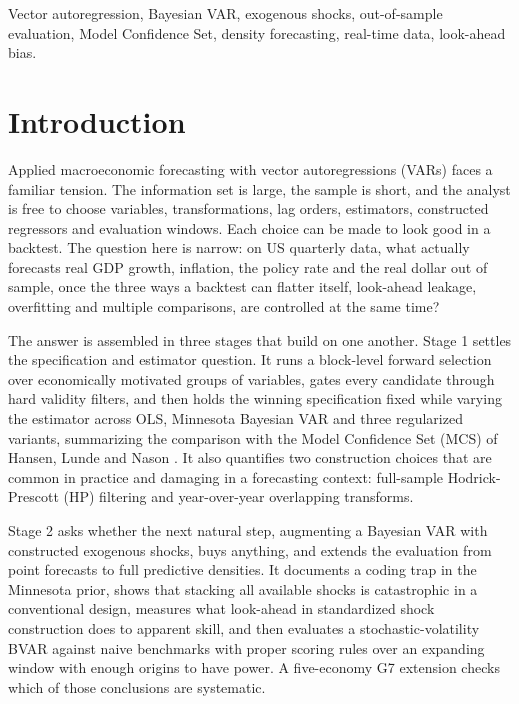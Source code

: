 \documentclass[conference]{IEEEtran}
\begin{document}
\begin{IEEEkeywords}
Vector autoregression, Bayesian VAR, exogenous shocks, out-of-sample evaluation, Model Confidence Set, density forecasting, real-time data, look-ahead bias.
\end{IEEEkeywords}

\section{Introduction}
Applied macroeconomic forecasting with vector autoregressions (VARs) faces a familiar tension. The information set is large, the sample is short, and the analyst is free to choose variables, transformations, lag orders, estimators, constructed regressors and evaluation windows. Each choice can be made to look good in a backtest. The question here is narrow: on US quarterly data, what actually forecasts real GDP growth, inflation, the policy rate and the real dollar out of sample, once the three ways a backtest can flatter itself, look-ahead leakage, overfitting and multiple comparisons, are controlled at the same time?

The answer is assembled in three stages that build on one another. Stage 1 settles the specification and estimator question. It runs a block-level forward selection over economically motivated groups of variables, gates every candidate through hard validity filters, and then holds the winning specification fixed while varying the estimator across OLS, Minnesota Bayesian VAR \cite{litterman1986,bgr2010} and three regularized variants, summarizing the comparison with the Model Confidence Set (MCS) of Hansen, Lunde and Nason \cite{hln2011}. It also quantifies two construction choices that are common in practice and damaging in a forecasting context: full-sample Hodrick-Prescott (HP) filtering \cite{hp1997} and year-over-year overlapping transforms.

Stage 2 asks whether the next natural step, augmenting a Bayesian VAR with constructed exogenous shocks, buys anything, and extends the evaluation from point forecasts to full predictive densities. It documents a coding trap in the Minnesota prior, shows that stacking all available shocks is catastrophic in a conventional design, measures what look-ahead in standardized shock construction does to apparent skill, and then evaluates a stochastic-volatility BVAR against naive benchmarks with proper scoring rules \cite{gneiting2007} over an expanding window with enough origins to have power. A five-economy G7 extension checks which of those conclusions are systematic.
\end{document}
